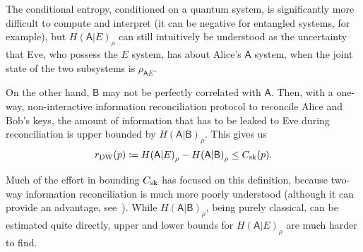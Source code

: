 \documentclass[10pt, a4paper]{article}
\numberwithin{equation}{section} %
\theoremstyle{definition}
\theoremstyle{plain}
\newcommand{\?}{\mathrel{?}} %
\newcommand{\crv}[1]{\mathsf{#1}}
\newcommand{\sk}{\rm sk}
\newcommand{\DW}{\rm DW}
\begin{document}
    The conditional entropy, conditioned on a quantum system, is significantly more difficult to compute and interpret (it can be negative for entangled systems, for example), but \({H(\crv{A}|E)}_{\rho}\) can still intuitively be understood as the uncertainty that Eve, who possess the \(E\) system, has about Alice's \(\crv{A}\) system, when the joint state of the two subsystems is \(\rho_{\crv{A}E}\).

    On the other hand, \(\crv{B}\) may not be perfectly correlated with \(\crv{A}\). Then, with a one-way, non-interactive information reconciliation protocol to reconcile Alice and Bob's keys, the amount of information that has to be leaked to Eve during reconciliation is upper bounded by \({H(\crv{A}|\crv{B})}_{\rho}\). This gives us
    \begin{equation}
      r_{\DW}(p) \coloneqq {H(\crv{A}|E)}_{\rho} - {H(\crv{A}|\crv{B})}_{\rho} \leq C_{\sk}(p).
    \end{equation}

    Much of the effort in bounding \(C_{\sk}\) has focused on this definition, because two-way information reconciliation is much more poorly understood (although it can provide an advantage, see~\cite{AdvantageDistill}).  While \({H(\crv{A}|\crv{B})}_{\rho}\), being purely classical, can be estimated quite directly, upper and lower bounds for \({H(\crv{A}|E)}_{\rho}\) are much harder to find.
\end{document}
